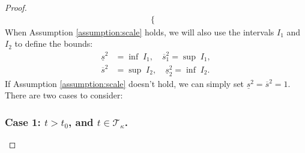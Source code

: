 \begin{proof}
\begin{align*}
\begin{cases}
    \end{cases}
\end{align*}
When Assumption \ref{assumption:scale} holds, we will also use the intervals $I_1$ and $I_2$ to define the bounds:
\begin{align} 
    \underline{s}^2 &= \inf \;I_1, \quad \overline{s}_1^2 = \sup \;I_1 \label{eq:thm3-s_0-I-1-bd}, \\
    \overline{s}^2 &= \sup \;I_2, \quad \underline{s}_2^2 = \inf \;I_2. \label{eq:thm3-s_0-I-2-bd}
\end{align}
If Assumption \ref{assumption:scale} doesn't hold, we can simply set $\underline{s}^2 = \overline{s}^2 = 1$. There are two cases to consider: 

\subsubsection*{Case 1: $t > t_0$, and $t \in \mathcal{T}_{\kappa}$.}


\end{proof}

